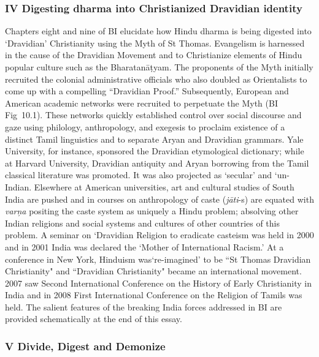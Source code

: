 \subsubsection*{IV Digesting dharma into Christianized Dravidian identity}

Chapters eight and nine of BI elucidate how Hindu dharma is being digested into ‘Dravidian’ Christianity using the Myth of St Thomas. Evangelism is harnessed in the cause of the Dravidian Movement and to Christianize elements of Hindu popular culture such as the Bharatanāṭyam. The proponents of the Myth initially recruited the colonial administrative officials who also doubled as Orientalists to come up with a compelling “Dravidian Proof.” Subsequently, European and American academic networks were recruited to perpetuate the Myth (BI Fig~10.1). These networks quickly established control over social discourse and gaze using philology, anthropology, and exegesis to proclaim existence of a distinct Tamil linguistics and to separate Aryan and Dravidian grammars. Yale University, for instance, sponsored the Dravidian etymological dictionary; while at Harvard University, Dravidian antiquity and Aryan borrowing from the Tamil classical literature was promoted. It was also projected as ‘secular’ and ‘un-Indian. Elsewhere at American universities, art and cultural studies of South India are pushed and in courses on anthropology of caste (\textit{jāti}-s) are equated with \textit{varņa} positing the caste system as uniquely a Hindu problem; absolving other Indian religions and social systems and cultures of other countries of this problem. A seminar on ‘Dravidian Religion to eradicate casteism was held in 2000 and in 2001 India was declared the ‘Mother of International Racism.’ At a conference in New York, Hinduism was‘re-imagined’ to be ``St Thomas Dravidian Christianity" and ``Dravidian Christianity" became an international movement. 2007 saw Second International Conference on the History of Early Christianity in India and in 2008 First International Conference on the Religion of Tamils was held. The salient features of the breaking India forces addressed in BI are provided schematically at the end of this essay.


\subsubsection*{V Divide, Digest and Demonize}

\vskip -6pt

